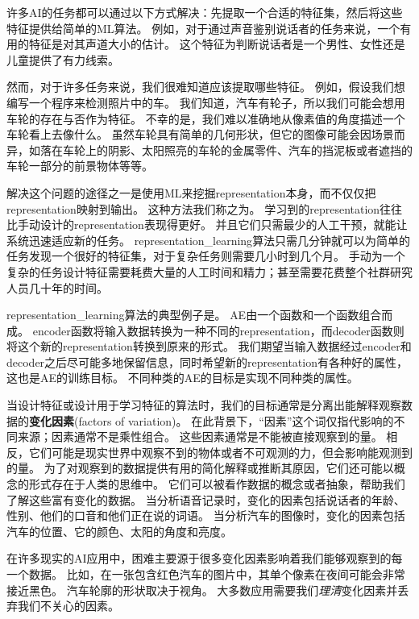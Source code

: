 许多\gls{AI}的任务都可以通过以下方式解决：先提取一个合适的特征集，然后将这些特征提供给简单的\gls{ML}算法。
例如，对于通过声音鉴别说话者的任务来说，一个有用的特征是对其声道大小的估计。
这个特征为判断说话者是一个男性、女性还是儿童提供了有力线索。

然而，对于许多任务来说，我们很难知道应该提取哪些特征。
例如，假设我们想编写一个程序来检测照片中的车。
我们知道，汽车有轮子，所以我们可能会想用车轮的存在与否作为特征。
不幸的是，我们难以准确地从像素值的角度描述一个车轮看上去像什么。
虽然车轮具有简单的几何形状，但它的图像可能会因场景而异，如落在车轮上的阴影、太阳照亮的车轮的金属零件、汽车的挡泥板或者遮挡的车轮一部分的前景物体等等。


解决这个问题的途径之一是使用\gls{ML}来挖掘\gls{representation}本身，而不仅仅把\gls{representation}映射到输出。
这种方法我们称之为。
学习到的\gls{representation}往往比手动设计的\gls{representation}表现得更好。
并且它们只需最少的人工干预，就能让系统迅速适应新的任务。
\gls{representation_learning}算法只需几分钟就可以为简单的任务发现一个很好的特征集，对于复杂任务则需要几小时到几个月。
手动为一个复杂的任务设计特征需要耗费大量的人工时间和精力；甚至需要花费整个社群研究人员几十年的时间。

\gls{representation_learning}算法的典型例子是。
\gls{AE}由一个函数和一个函数组合而成。
\gls{encoder}函数将输入数据转换为一种不同的\gls{representation}，而\gls{decoder}函数则将这个新的\gls{representation}转换到原来的形式。
我们期望当输入数据经过\gls{encoder}和\gls{decoder}之后尽可能多地保留信息，同时希望新的\gls{representation}有各种好的属性，
这也是\gls{AE}的训练目标。
不同种类的\gls{AE}的目标是实现不同种类的属性。

当设计特征或设计用于学习特征的算法时，我们的目标通常是分离出能解释观察数据的\textbf{变化因素}(factors of variation)。
在此背景下，``因素''这个词仅指代影响的不同来源；因素通常不是乘性组合。
这些因素通常是不能被直接观察到的量。
相反，它们可能是现实世界中观察不到的物体或者不可观测的力，但会影响能观测到的量。
为了对观察到的数据提供有用的简化解释或推断其原因，它们还可能以概念的形式存在于人类的思维中。
它们可以被看作数据的概念或者抽象，帮助我们了解这些富有变化的数据。
当分析语音记录时，变化的因素包括说话者的年龄、性别、他们的口音和他们正在说的词语。
当分析汽车的图像时，变化的因素包括汽车的位置、它的颜色、太阳的角度和亮度。


在许多现实的\gls{AI}应用中，困难主要源于很多变化因素影响着我们能够观察到的每一个数据。
比如，在一张包含红色汽车的图片中，其单个像素在夜间可能会非常接近黑色。
汽车轮廓的形状取决于视角。
大多数应用需要我们\emph{理清}变化因素并丢弃我们不关心的因素。

